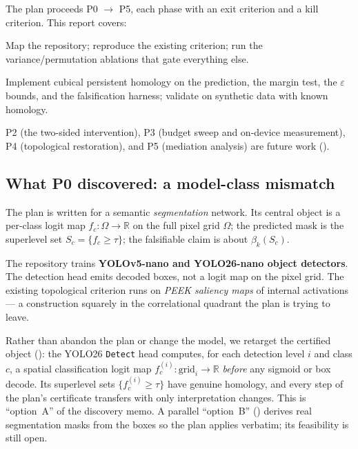 \documentclass[11pt]{article}
\newcommand{\code}[1]{\texttt{\small #1}}
\newcommand{\fc}{f_c^{(i)}}
\newcommand{\Betti}{\beta}
\newcommand{\R}{\mathbb{R}}
\theoremstyle{definition}
\theoremstyle{plain}
\begin{document}
The plan proceeds P0 $\to$ P5, each phase with an exit criterion and a kill
criterion. This report covers:

\begin{description}[style=nextline,leftmargin=1.5em]
\item[P0 --- Discovery and hygiene] Map the repository; reproduce the existing
criterion; run the variance/permutation ablations that gate everything else.
\item[P1 --- Build and audit the certificate] Implement cubical persistent
homology on the prediction, the margin test, the $\varepsilon$ bounds, and the
falsification harness; validate on synthetic data with known homology.
\end{description}

P2 (the two-sided intervention), P3 (budget sweep and on-device measurement), P4
(topological restoration), and P5 (mediation analysis) are future work
().

\subsection{What P0 discovered: a model-class mismatch}

The plan is written for a semantic \emph{segmentation} network. Its central
object is a per-class logit map $f_c : \Omega \to \R$ on the full pixel grid
$\Omega$; the predicted mask is the superlevel set $S_c = \{f_c \ge \tau\}$; the
falsifiable claim is about $\Betti_k(S_c)$.

The repository trains \textbf{YOLOv5-nano and YOLO26-nano object detectors}. The
detection head emits decoded boxes, not a logit map on the pixel grid. The
existing topological criterion runs on \emph{PEEK saliency maps} of internal
activations --- a construction squarely in the correlational quadrant the plan is
trying to leave.

Rather than abandon the plan or change the model, we retarget the certified
object (): the YOLO26 \code{Detect} head computes, for each
detection level $i$ and class $c$, a spatial classification logit map
$\fc : \text{grid}_i \to \R$ \emph{before} any sigmoid or box decode. Its
superlevel sets $\{\fc \ge \tau\}$ have genuine homology, and every step of the
plan's certificate transfers with only interpretation changes. This is
``option~A'' of the discovery memo. A parallel ``option~B'' ()
derives real segmentation masks from the boxes so the plan applies verbatim; its
feasibility is still open.
\end{document}
